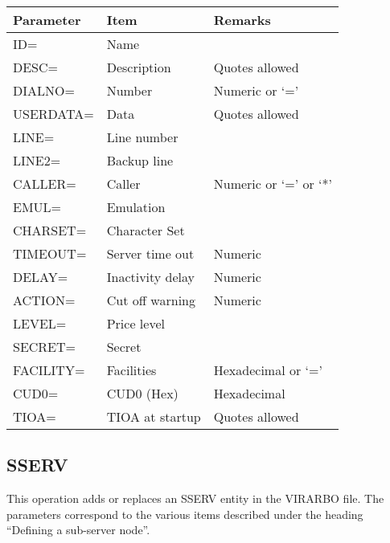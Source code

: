 \documentclass[letterpaper,10pt,english]{sphinxmanual}
\begin{document}
\begin{savenotes}\sphinxattablestart
\centering
\begin{tabulary}{\linewidth}[t]{|T|T|T|}
\hline
\sphinxstyletheadfamily 
Parameter
&\sphinxstyletheadfamily 
Item
&\sphinxstyletheadfamily 
Remarks
\\
\hline
ID=
&
Name
&\\
\hline
DESC=
&
Description
&
Quotes allowed
\\
\hline
DIALNO=
&
Number
&
Numeric or ‘=’
\\
\hline
USERDATA=
&
Data
&
Quotes allowed
\\
\hline
LINE=
&
Line number
&\\
\hline
LINE2=
&
Backup line
&\\
\hline
CALLER=
&
Caller
&
Numeric or ‘=’ or ‘*’
\\
\hline
EMUL=
&
Emulation
&\\
\hline
CHARSET=
&
Character Set
&\\
\hline
TIMEOUT=
&
Server time out
&
Numeric
\\
\hline
DELAY=
&
Inactivity delay
&
Numeric
\\
\hline
ACTION=
&
Cut off warning
&
Numeric
\\
\hline
LEVEL=
&
Price level
&\\
\hline
SECRET=
&
Secret
&\\
\hline
FACILITY=
&
Facilities
&
Hexadecimal or ‘=’
\\
\hline
CUD0=
&
CUD0 (Hex)
&
Hexadecimal
\\
\hline
TIOA=
&
TIOA at startup
&
Quotes allowed
\\
\hline
\end{tabulary}
\par
\sphinxattableend\end{savenotes}

\ignorespaces 

\subsection{SSERV}
\label{\detokenize{Installation_Guide:sserv}}\label{\detokenize{Installation_Guide:index-172}}
This operation adds or replaces an SSERV entity in the VIRARBO file. The parameters correspond to the various items described under the heading “Defining a sub-server node”.
\end{document}
